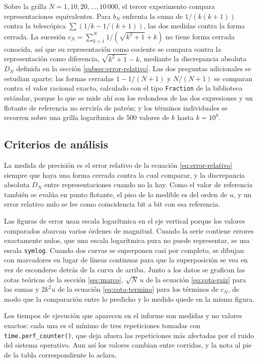 Sobre la grilla $N = 1, 10, 20, \ldots, 10\,000$, el tercer experimento compara representaciones
equivalentes. Para $b_N$ enfrenta la suma de $1/(k(k+1))$ contra la telescópica
$\sum (1/k - 1/(k+1))$, las dos medidas contra la forma cerrada. La sucesión
$c_N = \sum_{k=1}^{N} 1/(\sqrt{k^{2}+1} + k)$ no tiene forma cerrada conocida, así que su
representación como cociente se compara contra la representación como diferencia,
$\sqrt{k^{2}+1} - k$, mediante la discrepancia absoluta $D_N$ definida en la sección
\ref{subsec:error-relativo}. Las dos
preguntas adicionales se estudian aparte: las formas cerradas $1 - 1/(N+1)$ y $N/(N+1)$ se comparan
contra el valor racional exacto, calculado con el tipo \texttt{Fraction} de la biblioteca estándar,
porque lo que se mide ahí son los redondeos de las dos expresiones y un flotante de referencia no
serviría de patrón; y los términos individuales se recorren sobre una grilla logarítmica de 500
valores de $k$ hasta $k = 10^{8}$.

\subsection{Criterios de análisis}
\label{subsec:criterios}

La medida de precisión es el error relativo de la ecuación \eqref{eq:error-relativo} siempre que
haya una forma cerrada contra la cual comparar, y la discrepancia absoluta $D_N$ entre
representaciones cuando no la hay. Como el valor de referencia también se evalúa en punto flotante,
el piso de lo medible es del orden de $u$, y un error relativo nulo se lee como coincidencia bit a
bit con esa referencia.

Las figuras de error usan escala logarítmica en el eje vertical porque los valores comparados
abarcan varios órdenes de magnitud. Cuando la serie contiene errores exactamente nulos, que una
escala logarítmica pura no puede representar, se usa escala \texttt{symlog}. Cuando dos curvas se
superponen casi por completo, se dibujan con marcadores en lugar de líneas continuas para que la
superposición se vea en vez de esconderse detrás de la curva de arriba. Junto a los datos se grafican
las cotas teóricas de la sección \ref{sec:marco}, $\sqrt{N}\,u$ de la ecuación \eqref{eq:cota-raiz}
para las sumas y $2k^{2}u$ de la ecuación \eqref{eq:cota-termino} para los términos de $c_N$, de modo
que la comparación entre lo predicho y lo medido quede en la misma figura.

Los tiempos de ejecución que aparecen en el informe son medidas y no valores exactos: cada una es el
mínimo de tres repeticiones tomadas con \texttt{time.perf\_counter()}, que deja afuera las
repeticiones más afectadas por el ruido del sistema operativo. Aun así los valores cambian entre
corridas, y la nota al pie de la tabla correspondiente lo aclara.

